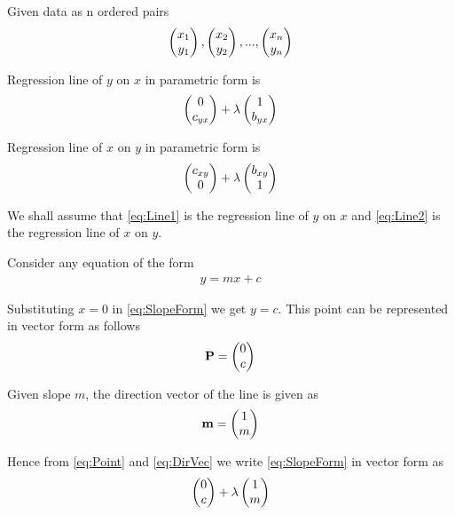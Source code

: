 \documentclass[journal,12pt,twocolumn]{IEEEtran}
\begin{document}
\solution

Given data as n ordered pairs
\begin{align}
  \begin{pmatrix}x_1\\y_1\end{pmatrix}, \begin{pmatrix}x_2\\y_2\end{pmatrix}, ..., \begin{pmatrix}x_n\\y_n\end{pmatrix}
\end{align}

Regression line of $y$ on $x$ in parametric form is
\begin{align}
  \begin{pmatrix}0\\c_{yx}\end{pmatrix} + \lambda\begin{pmatrix}1\\b_{yx}\end{pmatrix}
  \label{eq:Main_yx}
\end{align}

Regression line of $x$ on $y$ in parametric form is
\begin{align}
  \begin{pmatrix}c_{xy}\\0\end{pmatrix} + \lambda\begin{pmatrix}b_{xy}\\1\end{pmatrix}
  \label{eq:Main_xy}
\end{align}


We shall assume that
\eqref{eq:Line1}
is the regression line of $y$ on $x$ and
\eqref{eq:Line2}
is the regression line of $x$ on $y$.

Consider any equation of the form
\begin{align}
  y = mx + c
  \label{eq:SlopeForm}
\end{align}

Substituting $x = 0$ in
\eqref{eq:SlopeForm}
we get $y = c$. This point can be represented in vector form as follows
\begin{align}
  \mathbf{P} = \begin{pmatrix}0\\c\end{pmatrix}
  \label{eq:Point}
\end{align}

Given slope $m$, the direction vector of the line is given as
\begin{align}
  \mathbf{m} = \begin{pmatrix}1\\m\end{pmatrix}
  \label{eq:DirVec}
\end{align}

Hence from
\eqref{eq:Point}
and
\eqref{eq:DirVec}
we write
\eqref{eq:SlopeForm}
in vector form as
\begin{align}
  \begin{pmatrix}0\\c\end{pmatrix} + \lambda\begin{pmatrix}1\\m\end{pmatrix}
  \label{eq:Vec}
\end{align}
\end{document}
